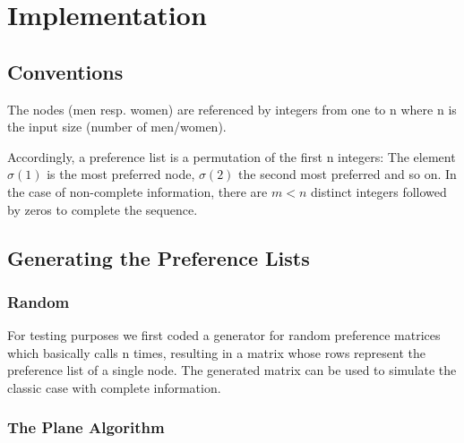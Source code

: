 \documentclass[11pt]{article}
\begin{document}
\section{Implementation}

\subsection{Conventions}

The nodes (men resp. women) are referenced by integers from one to n where n is the input
size (number of men/women).

Accordingly, a preference list is a permutation of the first n integers: The element $\sigma(1)$ 
is the most preferred node, $\sigma(2)$ the second most preferred and so on. In the case of 
non-complete information, there are $m<n$ distinct integers followed by zeros to complete the 
sequence.

\subsection{Generating the Preference Lists}

\subsubsection{Random}

For testing purposes we first coded a generator for random preference matrices which 
basically calls  n times, resulting in a matrix whose rows represent the 
preference list of a single node. The generated matrix can be used to simulate the classic 
case with complete information.

\subsubsection{The Plane Algorithm}
\end{document}
